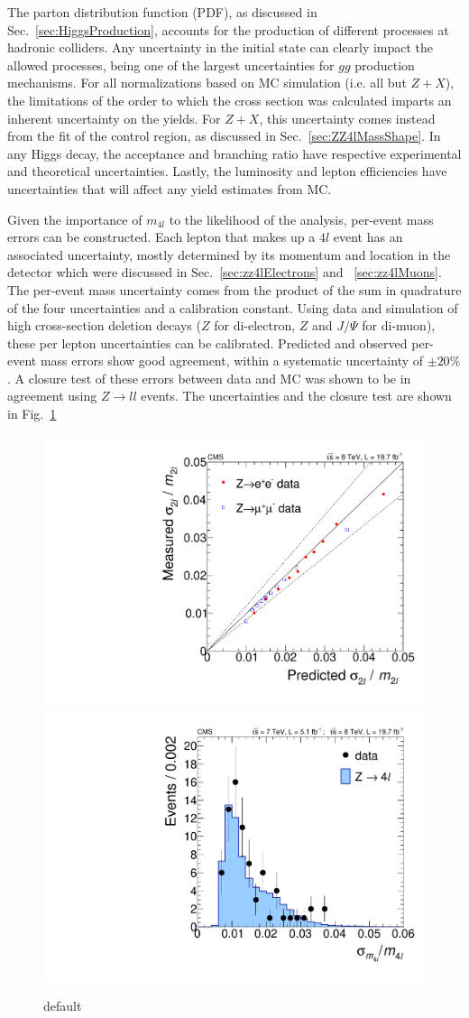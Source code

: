 The parton distribution function (PDF), as discussed in Sec.~\ref{sec:HiggsProduction}, accounts for the production of different processes at hadronic colliders. Any uncertainty in the initial state can clearly impact the allowed processes, being one of the largest uncertainties for $gg$ production mechanisms. For all normalizations based on MC simulation (i.e. all but $Z+X$), the limitations of the order to which the cross section was calculated imparts an inherent uncertainty on the yields. For $Z+X$, this uncertainty comes instead from the fit of the control region, as discussed in Sec.~\ref{sec:ZZ4lMassShape}. In any Higgs decay, the acceptance and branching ratio have respective experimental and theoretical uncertainties. Lastly, the luminosity and lepton efficiencies have uncertainties that will affect any yield estimates from MC.

Given the importance of $m_{4l}$ to the likelihood of the analysis, per-event mass errors can be constructed. Each lepton that makes up a $4l$ event has an associated uncertainty, mostly determined by its momentum and location in the detector which were discussed in Sec.~\ref{sec:zz4lElectrons} and ~\ref{sec:zz4lMuons}. The per-event mass uncertainty comes from the product of the sum in quadrature of the four uncertainties and a calibration constant. Using data and simulation of high cross-section deletion decays ($Z$ for di-electron, $Z$ and $J/\Psi$ for di-muon), these per lepton uncertainties can be calibrated. Predicted and observed per-event mass errors show good agreement, within a systematic uncertainty of $\pm20\%$. A closure test of these errors between data and MC was shown to be in agreement using $Z\rightarrow ll$ events. The uncertainties and the closure test are shown in Fig.~\ref{fig:PerEventMassErrors}

\begin{figure}[htbp]
\begin{center}
\includegraphics[width=.45\linewidth]{HiggsDiscovery/figures/DmassValid_Z2l.pdf}
\includegraphics[width=.45\linewidth]{HiggsDiscovery/figures/Dmass_Z4l.pdf}
\caption[Calibration and Closure Test of Per-Event Mass Errors in $4l$]{default}
\label{fig:PerEventMassErrors}
\end{center}
\end{figure}
 

